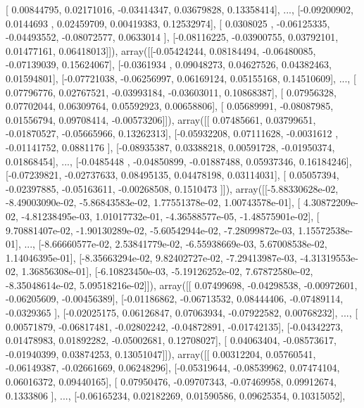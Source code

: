 \documentclass{article}
\begin{document}
       [ 0.00844795,  0.02171016, -0.03414347,  0.03679828,  0.13358414],
       ...,
       [-0.09200902,  0.0144693 ,  0.02459709,  0.00419383,  0.12532974],
       [ 0.0308025 , -0.06125335, -0.04493552, -0.08072577,  0.0633014 ],
       [-0.08116225, -0.03900755,  0.03792101,  0.01477161,  0.06418013]]), array([[-0.05424244,  0.08184494, -0.06480085, -0.07139039,  0.15624067],
       [-0.0361934 ,  0.09048273,  0.04627526,  0.04382463,  0.01594801],
       [-0.07721038, -0.06256997,  0.06169124,  0.05155168,  0.14510609],
       ...,
       [ 0.07796776,  0.02767521, -0.03993184, -0.03603011,  0.10868387],
       [ 0.07956328,  0.07702044,  0.06309764,  0.05592923,  0.00658806],
       [ 0.05689991, -0.08087985,  0.01556794,  0.09708414, -0.00573206]]), array([[ 0.07485661,  0.03799651, -0.01870527, -0.05665966,  0.13262313],
       [-0.05932208,  0.07111628, -0.0031612 , -0.01141752,  0.0881176 ],
       [-0.08935387,  0.03388218,  0.00591728, -0.01950374,  0.01868454],
       ...,
       [-0.0485448 , -0.04850899, -0.01887488,  0.05937346,  0.16184246],
       [-0.07239821, -0.02737633,  0.08495135,  0.04478198,  0.03114031],
       [ 0.05057394, -0.02397885, -0.05163611, -0.00268508,  0.1510473 ]]), array([[-5.88330628e-02, -8.49003090e-02, -5.86843583e-02,
         1.77551378e-02,  1.00743578e-01],
       [ 4.30872209e-02, -4.81238495e-03,  1.01017732e-01,
        -4.36588577e-05, -1.48575901e-02],
       [ 9.70881407e-02, -1.90130289e-02, -5.60542944e-02,
        -7.28099872e-03,  1.15572538e-01],
       ...,
       [-8.66660577e-02,  2.53841779e-02, -6.55938669e-03,
         5.67008538e-02,  1.14046395e-01],
       [-8.35663294e-02,  9.82402727e-02, -7.29413987e-03,
        -4.31319553e-02,  1.36856308e-01],
       [-6.10823450e-03, -5.19126252e-02,  7.67872580e-02,
        -8.35048614e-02,  5.09518216e-02]]), array([[ 0.07499698, -0.04298538, -0.00972601, -0.06205609, -0.00456389],
       [-0.01186862, -0.06713532,  0.08444406, -0.07489114, -0.0329365 ],
       [-0.02025175,  0.06126847,  0.07063934, -0.07922582,  0.00768232],
       ...,
       [ 0.00571879, -0.06817481, -0.02802242, -0.04872891, -0.01742135],
       [-0.04342273,  0.01478983,  0.01892282, -0.05002681,  0.12708027],
       [ 0.04063404, -0.08573617, -0.01940399,  0.03874253,  0.13051047]]), array([[ 0.00312204,  0.05760541, -0.06149387, -0.02661669,  0.06248296],
       [-0.05319644, -0.08539962,  0.07474104,  0.06016372,  0.09440165],
       [ 0.07950476, -0.09707343, -0.07469958,  0.09912674,  0.1333806 ],
       ...,
       [-0.06165234,  0.02182269,  0.01590586,  0.09625354,  0.10315052],
\end{document}
